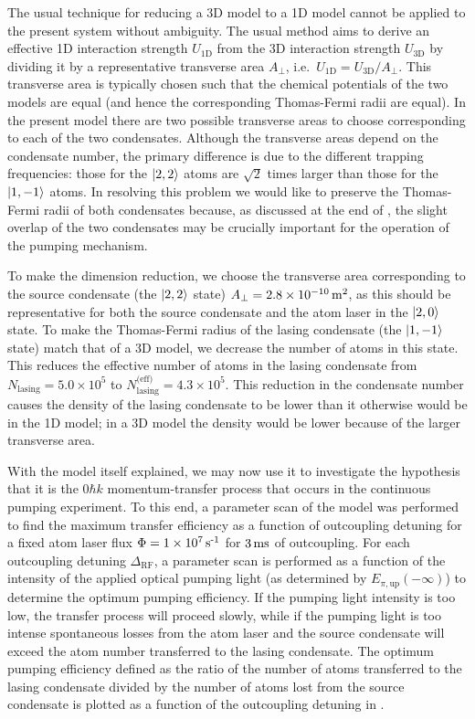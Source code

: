 The usual technique for reducing a 3D model to a 1D model cannot be applied to the present system without ambiguity.  The usual method aims to derive an effective 1D interaction strength $U_\text{1D}$ from the 3D interaction strength $U_\text{3D}$ by dividing it by a representative transverse area $A_\perp$, i.e.\ $U_\text{1D} = U_\text{3D}/A_\perp$.  This transverse area is typically chosen such that the chemical potentials of the two models are equal (and hence the corresponding Thomas-Fermi radii are equal).  In the present model there are two possible transverse areas to choose corresponding to each of the two condensates.  Although the transverse areas depend on the condensate number, the primary difference is due to the different trapping frequencies: those for the ${\left|2, 2\right>}$ atoms are $\sqrt{2}$ times larger than those for the ${\left|1, -1\right>}$ atoms.  In resolving this problem we would like to preserve the Thomas-Fermi radii of both condensates because, as discussed at the end of , the slight overlap of the two condensates may be crucially important for the operation of the pumping mechanism.

To make the dimension reduction, we choose the transverse area corresponding to the source condensate (the ${\left|2, 2\right>}$ state) $A_\perp = 2.8 \times\unit[10^{-10}]{m\textsuperscript{2}}$, as this should be representative for both the source condensate and the atom laser in the ${\left|2, 0\right>}$ state.  To make the Thomas-Fermi radius of the lasing condensate (the ${\left|1, -1\right>}$ state) match that of a 3D model, we decrease the number of atoms in this state.  This reduces the effective number of atoms in the lasing condensate from $N_\text{lasing} = 5.0\times 10^5$ to $N_\text{lasing}^\text{(eff)} = 4.3\times 10^5$.  This reduction in the condensate number causes the density of the lasing condensate to be lower than it otherwise would be in the 1D model; in a 3D model the density would be lower because of the larger transverse area.

\parasep

With the model itself explained, we may now use it to investigate the hypothesis that it is the $0 \hbar k$ momentum-transfer process that occurs in the continuous pumping experiment.  To this end, a parameter scan of the model was performed to find the maximum transfer efficiency as a function of outcoupling detuning for a fixed atom laser flux $\Phi = \unit[1\times 10^7]{s\textsuperscript{-1}}$ for $\unit[3]{ms}$ of outcoupling.  For each outcoupling detuning $\Delta_\text{RF}$, a parameter scan is performed as a function of the intensity of the applied optical pumping light (as determined by $E_{\pi, \text{up}}(-\infty)$) to determine the optimum pumping efficiency.  If the pumping light intensity is too low, the transfer process will proceed slowly, while if the pumping light is too intense spontaneous losses from the atom laser and the source condensate will exceed the atom number transferred to the lasing condensate.  The optimum pumping efficiency defined as the ratio of the number of atoms transferred to the lasing condensate divided by the number of atoms lost from the source condensate is plotted as a function of the outcoupling detuning in .

